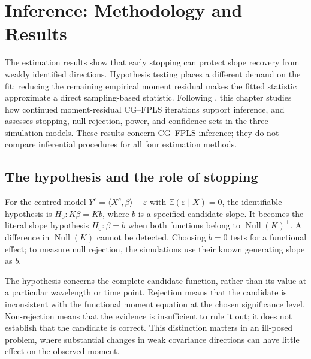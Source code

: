 \chapter{Inference: Methodology and Results}
\label{chap:main-inference}

The estimation results show that early stopping can protect slope recovery
from weakly identified directions.  Hypothesis testing places a different
demand on the fit: reducing the remaining empirical moment residual makes
the fitted statistic approximate a direct sampling-based statistic.  Following
\textcite{babii_carrasco_tsafack_2026}, this chapter studies how continued
moment-residual CG--FPLS iterations support inference, and assesses stopping,
null rejection, power, and confidence sets in the three simulation models.
These results concern CG--FPLS inference; they do not compare inferential
procedures for all four estimation methods.

\section{The hypothesis and the role of stopping}
\label{main:sec-inference-statistic}

For the centred model $Y^c=\langle X^c,\beta\rangle+\varepsilon$ with
$\mathbb E(\varepsilon\mid X)=0$, the identifiable hypothesis is
$H_0:K\beta=Kb$, where $b$ is a specified candidate slope.  It becomes the
literal slope hypothesis $H_0:\beta=b$ when both functions belong to
$\operatorname{Null}(K)^\perp$.  A difference in $\operatorname{Null}(K)$
cannot be detected.  Choosing $b=0$ tests for a functional effect; to measure
null rejection, the simulations use their known generating slope as $b$.

The hypothesis concerns the complete candidate function, rather than its
value at a particular wavelength or time point.  Rejection means that the
candidate is inconsistent with the functional moment equation at the chosen
significance level.  Non-rejection means that the evidence is insufficient
to rule it out; it does not establish that the candidate is correct.  This
distinction matters in an ill-posed problem, where substantial changes in
weak covariance directions can have little effect on the observed moment.

